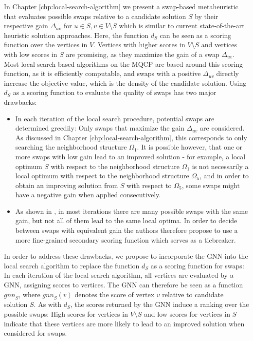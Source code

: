 \documentclass[draft,final]{vutinfth} %
\begin{document}
In Chapter \ref{chp:local-search-algorithm} we present a swap-based metaheuristic that evaluates possible swaps relative to a candidate solution $S$ by their respective gain $\Delta_{uv}$ for $u \in S, v \in V \setminus S$ which is similar to current state-of-the-art heuristic solution approaches. 
Here, the function $d_S$ can be seen as a scoring function over the vertices in $V$. Vertices with higher scores in $V \setminus S$ and vertices with low scores in $S$ are promising, as they maximize the gain of a swap $\Delta_{uv}$. 
Most local search based algorithms on the MQCP are based around this scoring function, as it is efficiently computable, and swaps with a positive $\Delta_{uv}$ directly increase the objective value, which is the density of the candidate solution. 
Using $d_S$ as a scoring function to evaluate the quality of swaps has two major drawbacks:
\begin{itemize}
    \item In each iteration of the local search procedure, potential swaps are determined greedily: Only swaps that maximize the gain $\Delta_{uv}$ are considered. As discussed in Chapter \ref{chp:local-search-algorithm}, this corresponds to only searching the neighborhood structure $\Omega_1$. It is possible however, that one or more swaps with low gain lead to an improved solution - for example, a local optimum $S$ with respect to the neighborhood structure $\Omega_1$ is not necessarily a local optimum with respect to the neighborhood structure $\Omega_5$, and in order to obtain an improving solution from $S$ with respect to $\Omega_5$, some swaps might have a negative gain when applied consecutively. 
    \item As shown in \cite{chen_nuqclq_2021}, in most iterations there are many possible swaps with the same gain, but not all of them lead to the same local optima. In order to decide between swaps with equivalent gain the authors therefore propose to use a more fine-grained secondary scoring function which serves as a tiebreaker. 
\end{itemize}

In order to address these drawbacks, we propose to incorporate the GNN into the local search algorithm to replace the function $d_S$ as a scoring function for swaps: In each iteration of the local search algorithm, all vertices are evaluated by a GNN, assigning scores to vertices. The GNN can therefore be seen as a function $\mathit{gnn}_S$, where $\mathit{gnn}_S(v)$ denotes the score of vertex $v$ relative to candidate solution $S$. 
As with $d_S$, the scores returned by the GNN induce a ranking over the possible swaps: High scores for vertices in $V \setminus S$ and low scores for vertices in $S$ indicate that these vertices are more likely to lead to an improved solution when considered for swaps. 
\end{document}
